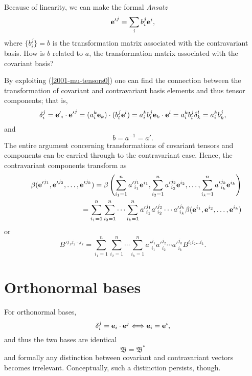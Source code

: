 Because of linearity, we can make the formal {\it Ansatz}
\begin{equation}
{{\bf e}'}^j=\sum_ib_i^j{\bf e}^i,
\end{equation}
where $\{b_i^j\}=b$ is
the transformation matrix associated with the contravariant basis.
How is $b$ related to $a$,
the transformation matrix associated with the covariant basis?

By exploiting (\ref{2001-mu-tensors0}) one can find the connection between
the transformation of covariant and contravariant basis elements and thus
tensor components; that is,
\begin{equation}
\delta_i^j= {{\bf e}'}_i\cdot {{\bf e}'}^j=(a_i^k{\bf e}_k)\cdot (b_l^j{\bf e}^l)=a_i^kb_l^j {\bf e}_k\cdot {\bf e}^l=a_i^kb_l^j \delta_k^l
=a_i^kb_k^j,
\end{equation}
and
\begin{equation}
b=a^{-1} =a'.
\end{equation}
The entire argument concerning transformations of covariant tensors and components
can be carried through to the contravariant case.
Hence, the contravariant components transform as
\begin{eqnarray}
&&\beta ( {{\bf e}'}^{j_1},{{\bf e}'}^{j_2},\ldots ,{{\bf e}'}^{j_k})=
\beta \left(
\sum_{i_1=1}^n {a'}^{j_1}_{i_1} {\bf e}^{i_1},
\sum_{i_2=1}^n {a'}^{j_2}_{i_2} {\bf e}^{i_2},
\ldots ,
\sum_{i_k=1}^n {a'}^{j_k}_{i_k} {\bf e}^{i_k}
\right)
\nonumber \\&& \quad
=
\sum_{i_1=1}^n\sum_{i_2=1}^n\cdots \sum_{i_k=1}^n
{a'}^{j_1}_{i_1}{a'}^{j_2}_{i_2}\cdots {a'}^{j_k}_{i_k} \beta ( {\bf e}^{i_1},{\bf e}^{i_2},\ldots ,{\bf e}^{i_k})
\end{eqnarray}
or
\begin{equation}
B'^{{j_1}{j_2}\cdots {j_k}}=
\sum_{i_1=1}^n\sum_{i_2=1}^n\cdots \sum_{i_k=1}^n
{a'}^{j_1}_{i_1}{a'}^{j_2}_{i_2}\cdots {a'}^{j_k}_{i_k} B^{i_1 i_2\ldots i_k}.
\end{equation}

\section{Orthonormal bases}
For orthonormal bases,
\begin{equation}
\delta_i^j = {\bf e}_i\cdot {\bf e}^j
\Longleftrightarrow
{\bf e}_i= {\bf e}^i  ,
\end{equation}
and thus the two bases are identical
\begin{equation}
{\mathfrak B}={\mathfrak B}^\ast
\end{equation}
and  formally any distinction between covariant and contravariant vectors becomes
irrelevant. Conceptually, such a distinction persists, though.



